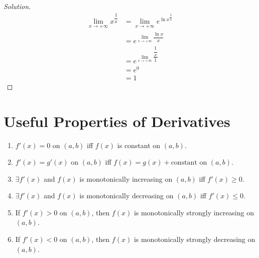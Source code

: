 \documentclass[fleqn]{article}
\theoremstyle{definition}
\theoremstyle{theorem}
\theoremstyle{remark}
\newenvironment{solution}
{\begin{proof}[Solution]\let\qed\relax}
	{\end{proof}}
\begin{document}
\begin{solution}
	\begin{align*}
	\lim\limits_{x \to +\infty} x^{\dfrac{1}{x}} &= \lim\limits_{x \to +\infty} e^{\ln x^{\dfrac{1}{x}}} \\
	&= e^ {\lim\limits_{x \to +\infty} \dfrac{\ln x}{x}} \\
	&= e^ {\lim\limits_{x \to +\infty} \dfrac{\dfrac{1}{x}}{1}} \\
	&= e^0 \\
	&= 1
	\end{align*}
\end{solution}

\section{Useful Properties of Derivatives}

\begin{enumerate}
	\item $f'(x) = 0$ on $(a, b)$ iff $f(x)$ is constant on $(a, b)$.
	\item $f'(x) = g'(x)$ on $(a, b)$ iff $f(x) = g(x) + \text{constant}$ on $(a, b)$.
	\item $\exists f'(x)$ and $f(x)$ is monotonically increasing on $(a, b)$ iff $f'(x) \geq 0$.
	\item $\exists f'(x)$ and $f(x)$ is monotonically decreasing on $(a, b)$ iff $f'(x) \leq 0$.
	\item If $f'(x) > 0$ on $(a, b)$, then $f(x)$ is monotonically strongly increasing on $(a, b)$.
	\item If $f'(x) < 0$ on $(a, b)$, then $f(x)$ is monotonically strongly decreasing on $(a, b)$.
\end{enumerate}
\end{document}
